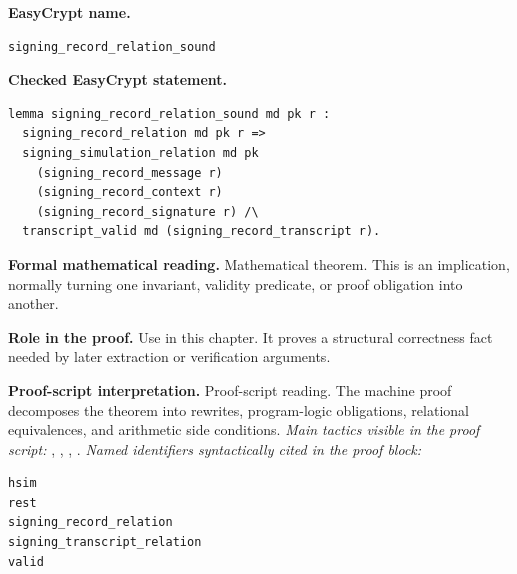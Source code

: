 \begin{formaltheorem}
\noindent\textbf{EasyCrypt name.}
\begin{lstlisting}[language=EasyCrypt,basicstyle=\ttfamily\scriptsize]
signing_record_relation_sound
\end{lstlisting}
\noindent\textbf{Checked EasyCrypt statement.}
\begin{lstlisting}[language=EasyCrypt,basicstyle=\ttfamily\scriptsize]
lemma signing_record_relation_sound md pk r :
  signing_record_relation md pk r =>
  signing_simulation_relation md pk
    (signing_record_message r)
    (signing_record_context r)
    (signing_record_signature r) /\
  transcript_valid md (signing_record_transcript r).
\end{lstlisting}
\noindent\textbf{Formal mathematical reading.}
Mathematical theorem. This is an implication, normally turning one invariant, validity predicate, or proof obligation into another.

\noindent\textbf{Role in the proof.}
Use in this chapter. It proves a structural correctness fact needed by later extraction or verification arguments.

\noindent\textbf{Proof-script interpretation.}
Proof-script reading. The machine proof decomposes the theorem into rewrites, program-logic obligations, relational equivalences, and arithmetic side conditions.
\emph{Main tactics visible in the proof script:} \ec{rewrite}, \ec{case}, \ec{split}, \ec{apply}.
\emph{Named identifiers syntactically cited in the proof block:}
\begin{lstlisting}[language=EasyCrypt,basicstyle=\ttfamily\scriptsize]
hsim
rest
signing_record_relation
signing_transcript_relation
valid
\end{lstlisting}

\end{formaltheorem}


